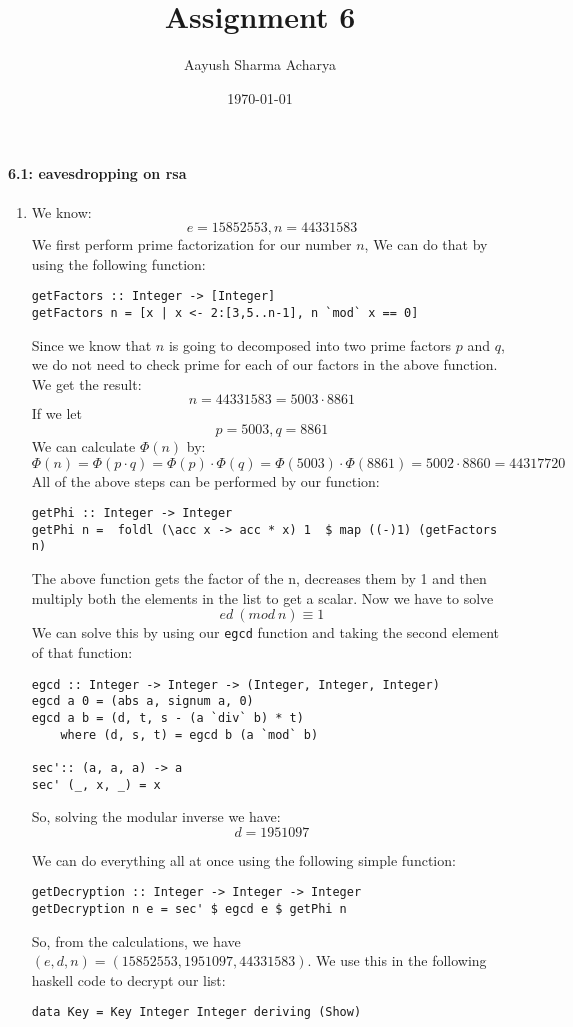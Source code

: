\documentclass[a4paper]{article}
\title{Assignment 6}
\author{Aayush Sharma Acharya}
\date{\today}
\begin{document}
\maketitle

\paragraph*{6.1: eavesdropping on rsa}

\begin{enumerate}[label=(\alph*)]
    \item We know: $$ e = 15852553,  n = 44331583 $$ 
        We first perform prime factorization for our number $n$, We can do that by using the following function: 
        \begin{verbatim}
getFactors :: Integer -> [Integer]
getFactors n = [x | x <- 2:[3,5..n-1], n `mod` x == 0]
        \end{verbatim}
        Since we know that $n$ is going to decomposed into two prime factors $p$ and $q$, we do not need to check prime for each of our factors in the above function. We get the result: $$ n = 44331583 = 5003 \cdot 8861$$
        If we let $$p = 5003 , q = 8861$$
        We can calculate $\Phi(n)$ by:
        $$ \Phi(n) = \Phi(p \cdot q) = \Phi(p) \cdot \Phi(q) = \Phi(5003) \cdot \Phi(8861) = 5002 \cdot 8860 = 44317720 $$
        All of the above steps can be performed by our function: 
        \begin{verbatim}
getPhi :: Integer -> Integer
getPhi n =  foldl (\acc x -> acc * x) 1  $ map ((-)1) (getFactors n)
        \end{verbatim}
        The above function gets the factor of the n, decreases them by 1 and then multiply both the elements in the list to get a scalar.
        Now we have to solve $$ed\ (mod\ n) \equiv 1$$
        We can solve this by using our \texttt{egcd} function and taking the second element of that function:
        \begin{verbatim}
egcd :: Integer -> Integer -> (Integer, Integer, Integer)
egcd a 0 = (abs a, signum a, 0)
egcd a b = (d, t, s - (a `div` b) * t)
    where (d, s, t) = egcd b (a `mod` b)

sec':: (a, a, a) -> a
sec' (_, x, _) = x
        \end{verbatim}
        So, solving the modular inverse we have:
        $$d = 1951097$$

        We can do everything all at once using the following simple function:
        \begin{verbatim}
getDecryption :: Integer -> Integer -> Integer
getDecryption n e = sec' $ egcd e $ getPhi n
        \end{verbatim}
    So, from the calculations, we have $(e, d, n) = (15852553, 1951097, 44331583)$. We use this  in the following  haskell code to decrypt our list:
    \begin{verbatim}
data Key = Key Integer Integer deriving (Show)


\end{verbatim}
\end{enumerate}
\end{document}
